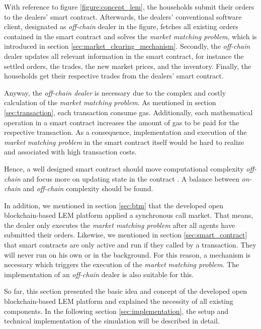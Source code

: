 With reference to figure \ref{figure:concept_lem}, the households submit their orders to the dealers' smart contract. 
Afterwards, the dealers' conventional software client, designated as \textit{off-chain} dealer in the figure, fetches all existing orders contained in the smart contract
and solves the \textit{market matching problem}, which is introduced in section \ref{sec:market_clearing_mechanism}.
Secondly, the \textit{off-chain} dealer updates all relevant information in the smart contract, for instance 
the settled orders, the trades, the new market prices, and the inventory.
Finally, the households get their respective trades from the dealers' smart contract. 

Anyway, the \textit{off-chain dealer} is necessary due to the complex and costly calculation of the \textit{market matching problem}. 
As mentioned in section \ref{sec:transaction}, each transaction consume gas. Additionally, each mathematical operation in a smart contract
increases the amount of gas to be paid for the respective transaction. As a consequence, implementation and execution of the \textit{market matching problem}
in the smart contract itself would be hard to realize and associated with high transaction costs. 

Hence, a well designed smart contract should move computational complexity \textit{off-chain} 
and focus more on updating state in the contract . A balance between \textit{on-chain}
and \textit{off-chain} complexity should be found.

In addition, we mentioned in section \ref{sec:btm} that the developed open blockchain-based LEM platform applied a synchronous
call market. That means, the dealer only executes the \textit{market matching problem} after all agents have submitted their orders.
Likewise, we mentioned in section \ref{sec:smart_contract} that smart contracts are only active and run if they called by a transaction.
They will never run on his own or in the background. For this reason, a mechanism is necessary which triggers the execution of the 
\textit{market matching problem}. The implementation of an \textit{off-chain} dealer is also suitable for this.

So far, this section presented the basic idea and concept of the developed open blockchain-based LEM platform
and explained the necessity of all existing components. In the following section \ref{sec:implementation}, the setup and technical implementation of the simulation will be described in detail. 

